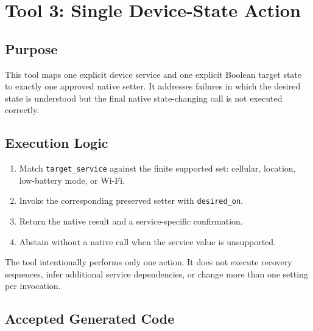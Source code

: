 \section{Tool 3: Single Device-State Action}
\label{sec:appendix-apply-device-state}

\subsection{Purpose}\label{purpose-2}

This tool maps one explicit device service and one explicit Boolean
target state to exactly one approved native setter. It addresses
failures in which the desired state is understood but the final native
state-changing call is not executed correctly.

\subsection{Execution Logic}\label{execution-logic-2}

\begin{enumerate}
\def\labelenumi{\arabic{enumi}.}
\tightlist
\item
  Match \texttt{target\_service} against the finite supported set:
  cellular, location, low-battery mode, or Wi-Fi.
\item
  Invoke the corresponding preserved setter with \texttt{desired\_on}.
\item
  Return the native result and a service-specific confirmation.
\item
  Abstain without a native call when the service value is unsupported.
\end{enumerate}

The tool intentionally performs only one action. It does not execute
recovery sequences, infer additional service dependencies, or change
more than one setting per invocation.

\subsection{Accepted Generated Code}\label{accepted-generated-code-2}

